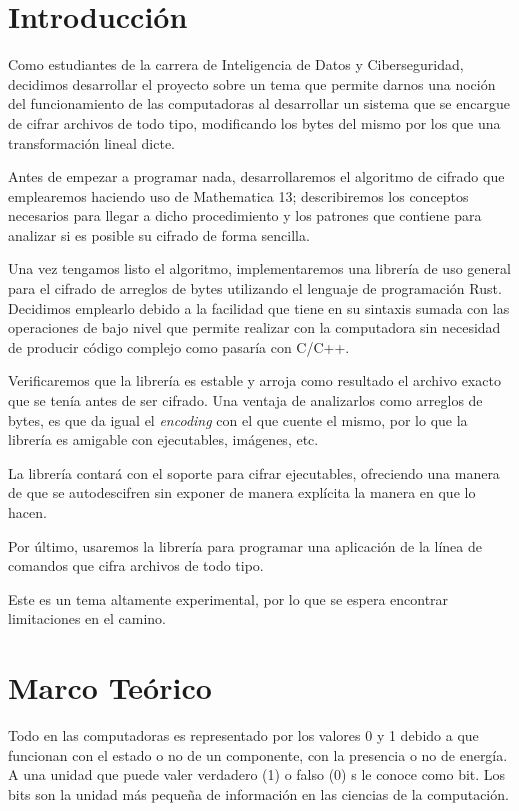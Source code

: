 \documentclass[a4paper]{article}
\begin{document}
\newpage

\section{Introducción}

Como estudiantes de la carrera de Inteligencia de Datos y Ciberseguridad,
decidimos desarrollar el proyecto sobre un tema que permite darnos una noción
del funcionamiento de las computadoras al desarrollar un sistema que se
encargue de cifrar archivos de todo tipo, modificando los bytes del mismo por
los que una transformación lineal dicte.

Antes de empezar a programar nada, desarrollaremos el algoritmo de cifrado que
emplearemos haciendo uso de Mathematica 13; describiremos los conceptos
necesarios para llegar a dicho procedimiento y los patrones que contiene para
analizar si es posible su cifrado de forma sencilla.

Una vez tengamos listo el algoritmo, implementaremos una librería de uso
general para el cifrado de arreglos de bytes utilizando el lenguaje de programación
Rust. Decidimos emplearlo debido a la facilidad que tiene en su
sintaxis sumada con las operaciones de bajo nivel que permite realizar con la
computadora sin necesidad de producir código complejo como pasaría con
C/C++.

Verificaremos que la librería es estable y arroja como resultado el archivo
exacto que se tenía antes de ser cifrado. Una ventaja de analizarlos
como arreglos de bytes, es que da igual el \textit{encoding} con el que cuente
el mismo, por lo que la librería es amigable con ejecutables, imágenes, etc.

La librería contará con el soporte para cifrar ejecutables, ofreciendo una
manera de que se autodescifren sin exponer de manera explícita la manera en que
lo hacen. 

Por último, usaremos la librería para programar una aplicación de la línea
de comandos que cifra archivos de todo tipo.

Este es un tema altamente experimental, por lo que se espera encontrar
limitaciones en el camino.

\newpage

\section{Marco Teórico}

Todo en las computadoras es representado por los valores 0 y 1 debido a que
funcionan con el estado o no de un componente, con la presencia o no de
energía.
A una unidad que puede valer verdadero (1) o falso (0) s le conoce como bit.
Los bits son la unidad más pequeña de información en las ciencias de la
computación.
\end{document}
